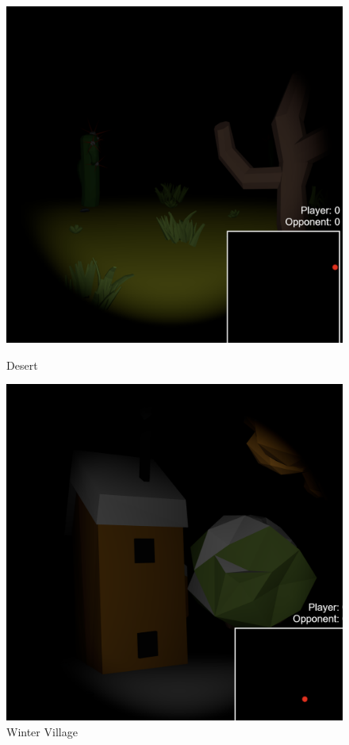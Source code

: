\documentclass[11pt]{article}
\begin{document}
\begin{figure}[h!]
    \vspace{1cm}

    \begin{minipage}{0.3\textwidth}
        \centering
        \includegraphics[width=\linewidth]{desert}
        \caption{Desert}
    \end{minipage}%
    \hspace{0.5cm}
    \begin{minipage}{0.3\textwidth}
        \centering
        \includegraphics[width=\linewidth]{winter}
        \caption{Winter Village}
    \end{minipage}
\end{figure}
\end{document}
